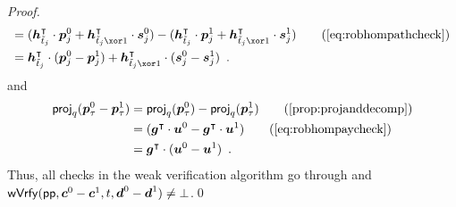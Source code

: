 \begin{proof}
\begin{align*}
    ={} &(\vec{h}_{\tilde t_j}^\transpose\cdot \vec{p}^0_{j} + \vec{h}_{\tilde t_j\xor 1}^\transpose \cdot \vec{s}^0_{j})- (\vec{h}_{\tilde t_j}^\transpose\cdot \vec{p}^1_{j} + \vec{h}_{\tilde t_j\xor 1}^\transpose \cdot \vec{s}^1_{j})\tag{\autoref{eq:robhompathcheck}}\\
    ={} &\vec{h}_{\tilde t_j}^\transpose\cdot (\vec{p}^0_{j} - \vec{p}^1_{j}) + \vec{h}_{\tilde t_j\xor 1}^\transpose \cdot (\vec{s}^0_{j} - \vec{s}^1_{j})\enspace.
  \end{align*}
  and
  \begin{align*}
    \projmod{q}(\vec{p}^0_{\tau}-\vec{p}^1_{\tau})
    ={} &\projmod{q}(\vec{p}^0_{\tau})-\projmod{q}(\vec{p}^1_{\tau})\tag{\autoref{prop:projanddecomp}}\\
    ={} &(\vec{g}^\transpose\cdot \vec{u}^0 - \vec{g}^\transpose \cdot \vec{u}^1)\tag{\autoref{eq:robhompaycheck}}\\
    ={} &\vec{g}^\transpose\cdot (\vec{u}^0 - \vec{u}^1)\enspace.
  \end{align*}
  Thus, all checks in the weak verification algorithm go through and $\mathsf{wVrfy}(\mathsf{pp},\boldsymbol{c}^0-\boldsymbol{c}^1, t,\boldsymbol{d}^0-\boldsymbol{d}^1)\neq\bot$.\qed
\end{proof}

